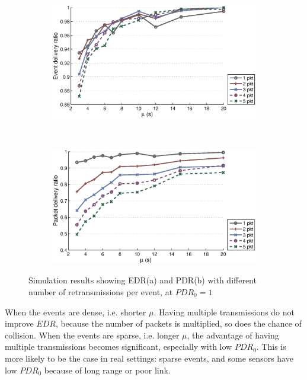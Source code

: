 \begin{figure}[p]
    \centering
    \begin{subfigure}[t]{0.9\textwidth}
        \centering
        \includegraphics[width=\textwidth] {../../sw/pc/matlab/simulation-result/retrans-count-edr-20min-pdr1.eps}
        \caption{}
    \end{subfigure} 
    \\
    \begin{subfigure}[t]{0.9\textwidth}
        \centering
        \includegraphics[width=\textwidth] {../../sw/pc/matlab/simulation-result/retrans-count-pdr-20min-pdr1.eps}
        \caption{}
    \end{subfigure}
    \caption[EDR and PDR with different transmission redundancy, $PDR_0 = 1$]{Simulation results showing EDR(a) and PDR(b) with different number of retransmissions per event, at $PDR_0 = 1$}\label{fig:retrans-lambda-1}
\end{figure}

When the events are dense, i.e. shorter $\mu$. Having multiple transmissions do not improve $EDR$, because the number of packets is multiplied, so does the chance of collision. When the events are sparse, i.e. longer $\mu$, the advantage of having multiple transmissions becomes significant, especially with low $PDR_0$. This is more likely to be the case in real settings: sparse events, and some sensors have low $PDR_0$ because of long range or poor link. 

